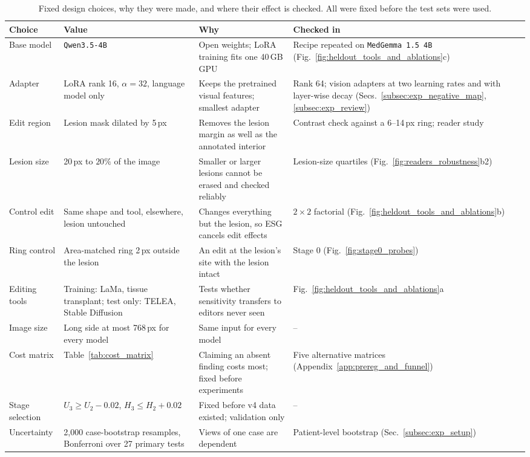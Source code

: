 \documentclass[10pt]{article}
\begin{document}
\begin{table}[!htbp]
\caption{Fixed design choices, why they were made, and where their effect is checked. All were fixed before the test sets were used.}
\label{tab:design}
\begin{center}
\small
\begin{adjustbox}{max width=\linewidth}
\begin{tabular}{L{2.6cm}L{3.4cm}L{4.6cm}L{3.6cm}}
\toprule
\textbf{Choice} & \textbf{Value} & \textbf{Why} & \textbf{Checked in} \\
\midrule
Base model & \texttt{Qwen3.5-4B} & Open weights; LoRA training fits one 40\,GB GPU & Recipe repeated on \texttt{MedGemma 1.5 4B} (Fig.~\ref{fig:heldout_tools_and_ablations}c) \\
Adapter & LoRA rank 16, $\alpha = 32$, language model only & Keeps the pretrained visual features; smallest adapter & Rank 64; vision adapters at two learning rates and with layer-wise decay (Secs.~\ref{subsec:exp_negative_map}, \ref{subsec:exp_review}) \\
Edit region & Lesion mask dilated by 5\,px & Removes the lesion margin as well as the annotated interior & Contrast check against a 6--14\,px ring; reader study \\
Lesion size & 20\,px to $20\%$ of the image & Smaller or larger lesions cannot be erased and checked reliably & Lesion-size quartiles (Fig.~\ref{fig:readers_robustness}b2) \\
Control edit & Same shape and tool, elsewhere, lesion untouched & Changes everything but the lesion, so ESG cancels edit effects & $2\times 2$ factorial (Fig.~\ref{fig:heldout_tools_and_ablations}b) \\
Ring control & Area-matched ring 2\,px outside the lesion & An edit at the lesion's site with the lesion intact & Stage 0 (Fig.~\ref{fig:stage0_probes}) \\
Editing tools & Training: LaMa, tissue transplant; test only: TELEA, Stable Diffusion & Tests whether sensitivity transfers to editors never seen & Fig.~\ref{fig:heldout_tools_and_ablations}a \\
Image size & Long side at most 768\,px for every model & Same input for every model & -- \\
Cost matrix & Table~\ref{tab:cost_matrix} & Claiming an absent finding costs most; fixed before experiments & Five alternative matrices (Appendix~\ref{app:prereg_and_funnel}) \\
Stage selection & $U_3 \ge U_2 - 0.02$, $H_3 \le H_2 + 0.02$ & Fixed before v4 data existed; validation only & -- \\
Uncertainty & 2{,}000 case-bootstrap resamples, Bonferroni over 27 primary tests & Views of one case are dependent & Patient-level bootstrap (Sec.~\ref{subsec:exp_setup}) \\
\bottomrule
\end{tabular}
\end{adjustbox}
\end{center}
\end{table}



\end{document}
